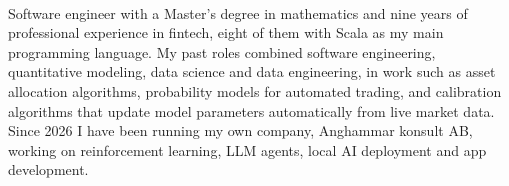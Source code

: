 \documentclass[10pt, a4paper]{article}
\begin{document}

  \noindent{\Huge\bfseries\textcolor{cvDarkgray}{Oscar Anghammar}}\\[0.45cm]
  \noindent
  \par\vspace{0.3cm}

  \noindent Software engineer with a Master's degree in mathematics and nine years of professional experience
  in fintech, eight of them with Scala as my main programming language. My past roles combined
  software engineering, quantitative modeling, data science and data engineering, in work such as asset
  allocation algorithms, probability models for automated trading, and calibration algorithms that update
  model parameters automatically from live market data. Since 2026 I have been running my own company,
  Anghammar konsult AB, working on reinforcement learning, LLM agents, local AI deployment and app development.
  \vspace{0.15cm}
\end{document}
